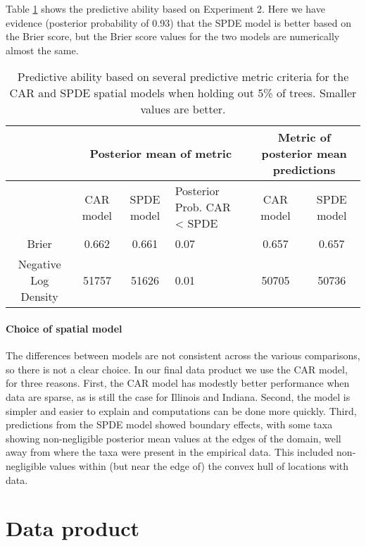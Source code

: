 \documentclass[12pt]{article}\usepackage[]{graphicx}\usepackage[]{color}
\providecommand{\tabularnewline}{\\}
\begin{document}
Table \ref{tab:score_tree} shows the predictive ability based on
Experiment 2. Here we have evidence (posterior probability of 0.93)
that the SPDE model is better based on the Brier score, but the Brier
score values for the two models are numerically almost the same.



\begin{table}
\caption{Predictive ability based on several predictive metric criteria for
the CAR and SPDE spatial models when holding out 5\% of trees. Smaller
values are better.}


\begin{tabular}{|c|c|c|>{\centering}p{3cm}|c|c|}
\hline 
 &
\multicolumn{3}{c|}{{\small{Posterior mean of metric}}} &
\multicolumn{2}{c|}{{\small{Metric of posterior mean predictions}}}\tabularnewline
\hline 
\hline 
 &
{\small{CAR model}} &
{\small{SPDE model}} &
{\small{Posterior Prob. CAR < SPDE}} &
{\small{CAR model}} &
{\small{SPDE model}}\tabularnewline
\hline 
{\small{Brier}} &
{\small{0.662}} &
{\small{0.661}} &
{\small{0.07}} &
{\small{0.657}} &
{\small{0.657}}\tabularnewline
\hline 
{\small{Negative Log Density}} &
{\small{51757}} &
{\small{51626}} &
{\small{0.01}} &
{\small{50705}} &
{\small{50736}}\tabularnewline
\hline 
\end{tabular}

\label{tab:score_tree}
\end{table}



\paragraph{Choice of spatial model}

The differences between models are not consistent across the various
comparisons, so there is not a clear choice. In our final data product
we use the CAR model, for three reasons. First, the CAR model has
modestly better performance when data are sparse, as is still the
case for Illinois and Indiana. Second, the model is simpler and easier
to explain and computations can be done more quickly. Third, predictions
from the SPDE model showed boundary effects, with some taxa showing
non-negligible posterior mean values at the edges of the domain, well
away from where the taxa were present in the empirical data. This
included non-negligible values within (but near the edge of) the convex
hull of locations with data. 


\section{Data product\label{sec:Data-product}}
\end{document}
